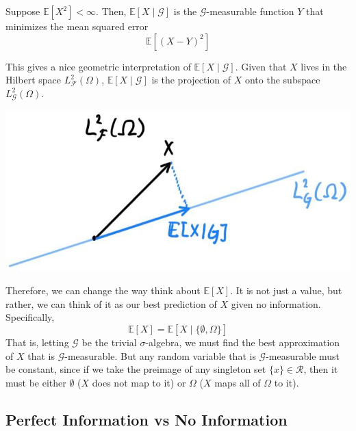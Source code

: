 \documentclass{article}
\begin{document}
    \begin{theorem}
      Suppose $\mathbb{E}[X^2] < \infty$. Then, $\mathbb{E}[X \mid \mathcal{G}]$ is the $\mathcal{G}$-measurable function $Y$ that minimizes the mean squared error 
      \begin{equation}
        \mathbb{E}[ (X - Y)^2]
      \end{equation}
    \end{theorem}

    This gives a nice geometric interpretation of $\mathbb{E}[X \mid \mathcal{G}]$. Given that $X$ lives in the Hilbert space $L^2_\mathcal{F} (\Omega)$, $\mathbb{E}[X \mid \mathcal{G}]$ is the projection of $X$ onto the subspace $L^2_\mathcal{G} (\Omega)$. 
    \begin{center}
      \includegraphics[scale=0.3]{img/Hilbert_Space_projection.jpg}
    \end{center}
    Therefore, we can change the way think about $\mathbb{E}[X]$. It is not just a value, but rather, we can think of it as our best prediction of $X$ given no information. Specifically, 
    \begin{equation}
      \mathbb{E}[X] = \mathbb{E}[X \mid \{\emptyset, \Omega\}]
    \end{equation}
    That is, letting $\mathcal{G}$ be the trivial $\sigma$-algebra, we must find the best approximation of $X$ that is $\mathcal{G}$-measurable. But any random variable that is $\mathcal{G}$-measurable must be constant, since if we take the preimage of any singleton set $\{x\} \in \mathcal{R}$, then it must be either $\emptyset$ ($X$ does not map to it) or $\Omega$ ($X$ maps all of $\Omega$ to it).

  \subsection{Perfect Information vs No Information}
\end{document}
